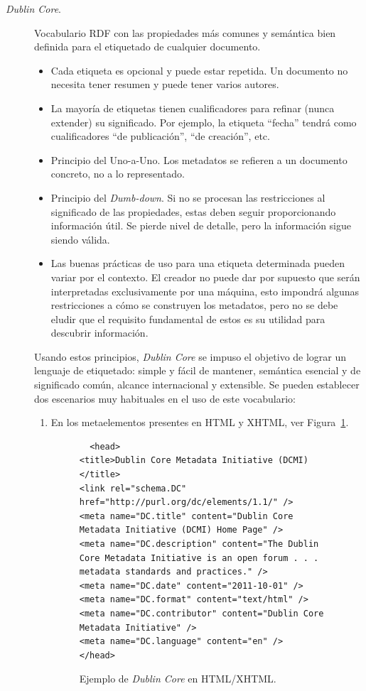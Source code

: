 \begin{description}
\item[\textit{Dublin Core}.] Vocabulario RDF con las propiedades más comunes y semántica bien definida para el etiquetado de cualquier documento.

\begin{itemize}
  \item Cada etiqueta es opcional y puede estar repetida. Un documento no
  necesita tener resumen y puede tener varios autores.
  \item La mayoría de etiquetas tienen cualificadores para refinar (nunca extender) su significado.
Por ejemplo, la etiqueta ``fecha'' tendrá como cualificadores ``de publicación'',
``de creación'', etc.
\item Principio del Uno-a-Uno. Los metadatos se refieren a un documento
concreto, no a lo representado. 
\item  Principio del \textit{Dumb-down}. Si no se procesan las restricciones al
significado de las \linebreak propiedades, estas deben seguir proporcionando información
útil. Se pierde nivel de detalle, pero la información sigue siendo válida.
\item Las buenas prácticas de uso para una etiqueta determinada pueden variar por
el contexto. El creador no puede dar por supuesto que serán interpretadas exclusivamente por
una máquina, esto impondrá algunas restricciones a cómo se construyen los
metadatos, pero no se debe eludir que el requisito fundamental de
estos es su utilidad para descubrir información.
\end{itemize}

Usando estos principios, \textit{Dublin Core} se impuso el objetivo de lograr un lenguaje
de etiquetado: simple y fácil de mantener, semántica esencial y de significado común, alcance internacional y extensible.
Se pueden establecer dos escenarios muy habituales en el uso de este vocabulario:
\begin{enumerate}
  \item En los metaelementos presentes en \gls{HTML} y \gls{XHTML}, ver Figura~\ref{fig:html-dc-example}.

\begin{figure}[!htbp]
\centering
  \begin{lstlisting} 
  <head>
<title>Dublin Core Metadata Initiative (DCMI)</title>
<link rel="schema.DC" href="http://purl.org/dc/elements/1.1/" />
<meta name="DC.title" content="Dublin Core Metadata Initiative (DCMI) Home Page" />
<meta name="DC.description" content="The Dublin Core Metadata Initiative is an open forum . . . metadata standards and practices." />
<meta name="DC.date" content="2011-10-01" />
<meta name="DC.format" content="text/html" />
<meta name="DC.contributor" content="Dublin Core Metadata Initiative" />
<meta name="DC.language" content="en" />
</head>  
 \end{lstlisting} 
\label{fig:html-dc-example}
\caption{Ejemplo de \textit{Dublin Core} en HTML/XHTML.}
\end{figure}
 

\end{enumerate}
\end{description}
